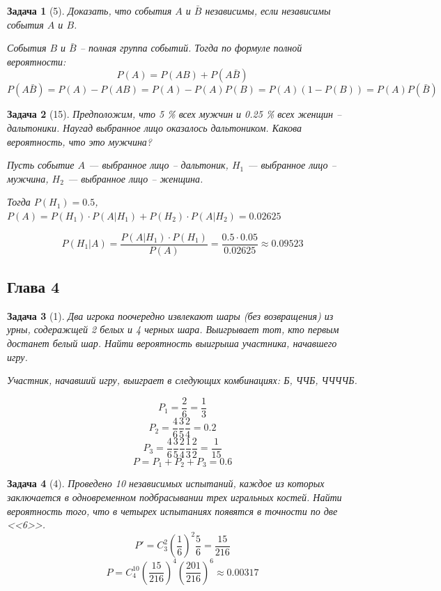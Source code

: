 \documentclass{article}
\theoremstyle{problemstyle}
\newtheorem{problem}{Задача}[section]
\begin{document}
\begin{problem}[5]
    Доказать, что события $A$ и $\bar B$ независимы,
    если независимы события $A$ и $B$.

    События $B$ и $\bar B$ -- полная группа событий.
    Тогда по формуле полной вероятности:
    \[ P(A) = P(A B) + P (A \bar B) \]
    \[ P(A \bar B) = P(A) - P(A B) = P(A) - P(A) P(B) = P(A) (1 - P(B)) = P(A) P(\bar B) \]
\end{problem}

\begin{problem}[15]
    Предположим, что 5 \% всех мужчин и 0.25 \% всех женщин -- дальтоники.
    Наугад выбранное лицо оказалось дальтоником.
    Какова вероятность, что это мужчина?

    Пусть событие $A$ --- выбранное лицо -- дальтоник, $H_1$ --- выбранное лицо -- мужчина,
    $H_2$ --- выбранное лицо -- женщина.

    Тогда $P(H_1) = 0.5$, $P(A) = P(H_1) \cdot P(A | H_1) + P(H_2) \cdot P(A | H_2) = 0.02625 $

    \[ P(H_1 | A) = \frac{P(A | H_1) \cdot P(H_1)}{P(A)} = \frac{0.5 \cdot 0.05}{0.02625} \approx 0.09523 \]
    
\end{problem}

\subsection{Глава 4}
\begin{problem}[1]
    Два игрока поочередно извлекают шары (без возвращения)
    из урны, содеражщей 2 белых и 4 черных шара.
    Выигрывает тот, кто первым достанет белый шар.
    Найти вероятность выигрыша участника, начавшего игру.

    Участник, начавший игру, выиграет в следующих комбинациях: Б, ЧЧБ, ЧЧЧЧБ.

    \[ P_1 = \frac{2}{6} = \frac{1}{3} \]
    \[ P_2 = \frac{4}{6} \frac{3}{5} \frac{2}{4} = 0.2 \]
    \[ P_3 = \frac{4}{6} \frac{3}{5} \frac{2}{4} \frac{1}{3} \frac{2}{2} = \frac{1}{15} \]
    \[ P = P_1 + P_2 + P_3 = 0.6 \]
\end{problem}

\begin{problem}[4]
    Проведено 10 независимых испытаний, каждое из которых
    заключается в одновременном подбрасывании
    трех игральных костей.
    Найти вероятность того, что в четырех испытаниях появятся в точности
    по две <<6>>.
    \[ P'= C_3^2 \left(\frac{1}{6}\right)^2 \frac{5}{6} = \frac{15}{216} \]
    \[ P = C_4^{10} \left(\frac{15}{216}\right)^4 \left(\frac{201}{216}\right)^6 \approx 0.00317 \]
    
\end{problem}
\end{document}
